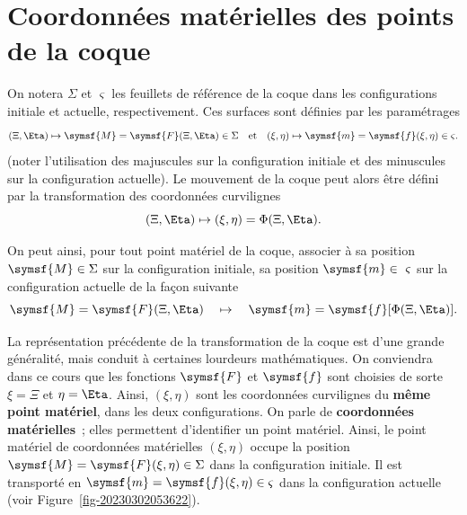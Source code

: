 \documentclass[
  a4paper,
  DIV=11,
  numbers=noendperiod]{scrreprt}
\newcommand{\point}[1]{\symsf{#1}}
\begin{document}
\hypertarget{coordonnuxe9es-matuxe9rielles-des-points-de-la-coque}{%
\section{Coordonnées matérielles des points de la
coque}\label{coordonnuxe9es-matuxe9rielles-des-points-de-la-coque}}

On notera \(\Sigma\) et \(\varsigma\) les feuillets de référence de la
coque dans les configurations initiale et actuelle, respectivement. Ces
surfaces sont définies par les paramétrages \[
(\Xi, \Eta) \mapsto \point{M} = \point{F}(\Xi, \Eta) \in \Sigma
\quad \text{et} \quad
(\xi, \eta) \mapsto \point{m} = \point{f}(\xi, \eta) \in \varsigma.
\] (noter l'utilisation des majuscules sur la configuration initiale et
des minuscules sur la configuration actuelle). Le mouvement de la coque
peut alors être défini par la transformation des coordonnées curvilignes
\[
(\Xi, \Eta) \mapsto (\xi, \eta) = \Phi(\Xi, \Eta).
\]

On peut ainsi, pour tout point matériel de la coque, associer à sa
position \(\point{M} \in \Sigma\) sur la configuration initiale, sa
position \(\point{m} \in \varsigma\) sur la configuration actuelle de la
façon suivante \[
\point{M} = \point{F}(\Xi, \Eta) \quad \mapsto \quad \point{m} = \point{f} [ \Phi(\Xi, \Eta) ].
\]

La représentation précédente de la transformation de la coque est d'une
grande généralité, mais conduit à certaines lourdeurs mathématiques. On
conviendra dans ce cours que les fonctions \(\point{F}\) et
\(\point{f}\) sont choisies de sorte \(\xi = \Xi\) et \(\eta = \Eta\).
Ainsi, \((\xi, \eta)\) sont les coordonnées curvilignes du \textbf{même
point matériel}, dans les deux configurations. On parle de
\textbf{coordonnées matérielles}~; elles permettent d'identifier un
point matériel. Ainsi, le point matériel de coordonnées matérielles
\((\xi, \eta)\) occupe la position
\(\point{M} = \point{F}(\xi, \eta) \in \Sigma\) dans la configuration
initiale. Il est transporté en
\(\point{m} = \point{f}(\xi, \eta) \in \varsigma\) dans la configuration
actuelle (voir Figure~\ref{fig-20230302053622}).
\end{document}
